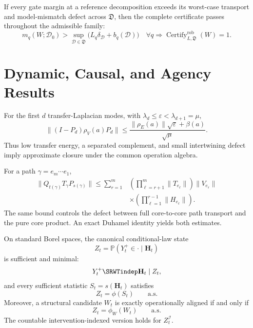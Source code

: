 
If every gate margin at a reference decomposition exceeds its worst-case
transport and model-mismatch defect across \(\mathfrak D\), then the complete
certificate passes throughout the admissible family:
\[
\boxed{
 m_q(W;\mathcal D_0)
>
\sup_{\mathcal D\in\mathfrak D}
\bigl(L_q\delta_{\mathcal D}+b_q(\mathcal D)\bigr)
\quad\forall q
\Longrightarrow
\operatorname{Certify}_{L,\mathfrak D}^{\mathrm{rob}}(W)=1.
}
\]

\section{Dynamic, Causal, and Agency Results}


For the first \(d\) transfer-Laplacian modes, with
\(\lambda_d\leq\varepsilon<\lambda_{d+1}=\mu\),
\[
\boxed{
\|(I-P_d)\rho_V(a)P_d\|
\leq
\frac{\|\rho_E(a)\|\sqrt{\varepsilon}+\beta(a)}{\sqrt{\mu}}.
}
\]
Thus low transfer energy, a separated complement, and small intertwining defect
imply approximate closure under the common operation algebra.


For a path \(\gamma=e_m\cdots e_1\),
\[
\boxed{
\begin{aligned}
\|Q_{t(\gamma)}T_\gamma P_{s(\gamma)}\|
\leq
\sum_{r=1}^{m}
&\left(
\prod_{\ell=r+1}^{m}\|T_{e_\ell}\|
\right)
\|V_{e_r}\|\\
&\times
\left(
\prod_{\ell=1}^{r-1}\|H_{e_\ell}\|
\right).
\end{aligned}
}
\]
The same bound controls the defect between full core-to-core path transport and
the pure core product. An exact Duhamel
identity yields both estimates.


On standard Borel spaces, the canonical conditional-law state
\[
Z_t
=
\mathbb P(Y_t^+\in\cdot\mid\mathbf H_t)
\]
is sufficient and minimal:
\[
Y_t^+\SRWTindep\mathbf H_t\mid Z_t,
\]
and every sufficient statistic \(S_t=s(\mathbf H_t)\) satisfies
\[
Z_t=\phi(S_t)
\qquad\text{a.s.}
\]
Moreover, a structural candidate \(W_t\) is exactly operationally aligned if
and only if
\[
Z_t=\phi_W(W_t)
\qquad\text{a.s.}
\]
The countable intervention-indexed version holds for
\(Z_t^{\mathcal I}\).

